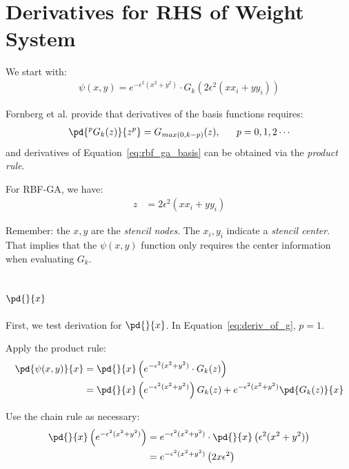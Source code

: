 \documentclass[11pt]{report}
\begin{document}
\tableofcontents
\fi

{ \graphicspath{{rbffd_methods_content/}}

\chapter{Derivatives for RHS of Weight System}
We start with:
\begin{align} 
\psi (x,y) = e^{-\epsilon^2(x^2+y^2)} \cdot G_k(2\epsilon^2(x x_i +y y_i)) \label{eq:rbf_ga_basis}
\end{align}

Fornberg et al. \cite{FornbergLehtoPowell12} provide that derivatives of the basis functions requires:
\begin{align}
\pd{^p G_k(z)}{z^p} = G_{max(0,k-p)} (z), \ \ \ \ \ p = 0, 1, 2 \cdots 
\label{eq:deriv_of_g}
\end{align}
and derivatives of Equation~\ref{eq:rbf_ga_basis} can be obtained via the \emph{product rule}. 

For RBF-GA, we have: 
\begin{align}
z & = 2\epsilon^2(x x_i + y y_i) \label{eq:gamma_z}
\end{align}

Remember: the $x, y$ are the \emph{stencil nodes}. The $x_i, y_i$ indicate a \emph{stencil center}. That implies that the $\psi(x,y)$ function only requires the center information when evaluating $G_k$.

\section{$\pd{}{x}$}

First, we test derivation for $\pd{}{x}$. In Equation~\ref{eq:deriv_of_g}, $p=1$.

Apply the product rule: 
\begin{align}
\pd{\psi(x,y)}{x} & = \pd{}{x} \left( e^{-\epsilon^2(x^2+y^2)} \cdot G_k(z)  \right) \nonumber \\
& = \pd{}{x}\left( e^{-\epsilon^2 (x^2 + y^2)} \right) G_k(z) + e^{-\epsilon^2(x^2 + y^2)} \pd{G_k(z)}{x} \label{eq:x_product_rule}
\end{align}

Use the chain rule as necessary:
\begin{align}
\pd{}{x}\left( e^{-\epsilon^2 (x^2 + y^2)} \right) & = e^{-\epsilon^2 (x^2 + y^2)} \cdot \pd{}{x} \left( \epsilon^2(x^2+y^2) \right) \nonumber \\
        & = e^{-\epsilon^2 (x^2 + y^2)} \left(2x \epsilon^2 \right) \label{eq:x_part1}
\end{align}

}
\end{document}
